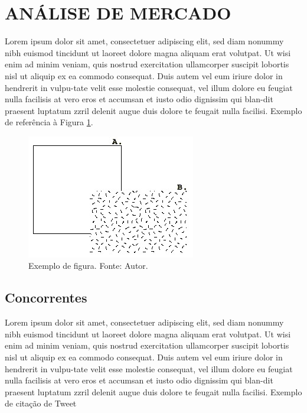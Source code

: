 \section{ANÁLISE DE MERCADO}
\label{secao:analise_pesquisa_de_mercado}
Lorem ipsum dolor sit amet, consectetuer adipiscing elit, sed diam nonummy nibh euismod tincidunt ut laoreet dolore magna aliquam erat volutpat. Ut wisi enim ad minim veniam, quis nostrud exercitation ullamcorper suscipit lobortis nisl ut aliquip ex ea commodo consequat. Duis autem vel eum iriure dolor in hendrerit in vulpu-tate velit esse molestie consequat, vel illum dolore eu feugiat nulla facilisis at vero eros et accumsan et iusto odio dignissim qui blan-dit praesent luptatum zzril delenit augue duis dolore te feugait nulla facilisi.
Exemplo de referência à Figura \ref{figura:exemplo}.

\begin{figure}[htb]
  \includegraphics[width=0.8\columnwidth]{figure.jpg}
  \centering
  \caption{Exemplo de figura. Fonte: Autor.}
  \label{figura:exemplo}
\end{figure}

\subsection{Concorrentes}
\label{secao:concorrentes}
Lorem ipsum dolor sit amet, consectetuer adipiscing elit, sed diam nonummy nibh euismod tincidunt ut laoreet dolore magna aliquam erat volutpat. Ut wisi enim ad minim veniam, quis nostrud exercitation ullamcorper suscipit lobortis nisl ut aliquip ex ea commodo consequat. Duis autem vel eum iriure dolor in hendrerit in vulpu-tate velit esse molestie consequat, vel illum dolore eu feugiat nulla facilisis at vero eros et accumsan et iusto odio dignissim qui blan-dit praesent luptatum zzril delenit augue duis dolore te feugait nulla facilisi.
Exemplo de citação de Tweet \cite{stacey2011}

